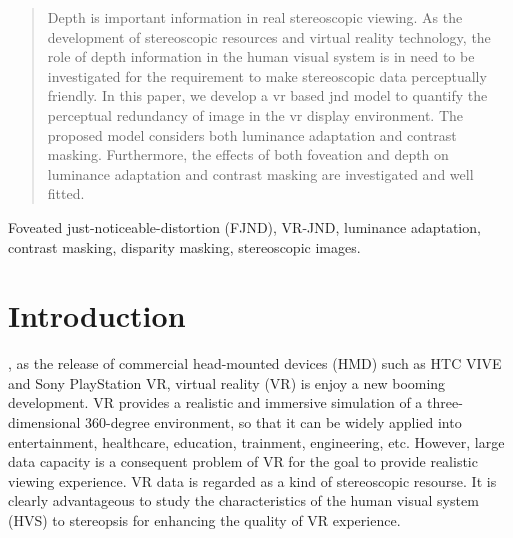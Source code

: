 \documentclass[journal]{IEEEtran}
\begin{document}



\maketitle

\begin{abstract}
Depth is important information in real stereoscopic viewing. As the development of stereoscopic resources and virtual reality technology, the role of depth information in the human visual system is in need to be investigated for the requirement to make stereoscopic data perceptually friendly. In this paper, we develop a vr based jnd model to quantify the perceptual redundancy of image in the vr display environment. The proposed model considers both luminance adaptation and contrast masking. Furthermore, the effects of both foveation and depth on luminance adaptation and contrast masking are investigated and well fitted.
\end{abstract}

\begin{IEEEkeywords}
Foveated just-noticeable-distortion (FJND), VR-JND, luminance adaptation, contrast masking, disparity masking, stereoscopic images.
\end{IEEEkeywords}


\IEEEpeerreviewmaketitle

\section{Introduction}
, as the release of commercial head-mounted devices (HMD) such as HTC VIVE and Sony PlayStation VR, virtual reality (VR) is enjoy a new booming development. VR provides a realistic and immersive simulation of a three-dimensional 360-degree environment, so that it can be widely applied into entertainment, healthcare, education, trainment, engineering, etc. However, large data capacity is a consequent problem of VR for the goal to provide realistic viewing experience. VR data is regarded as a kind of stereoscopic resourse. It is clearly advantageous to study the characteristics of the human visual system (HVS) to stereopsis for enhancing the quality of VR experience.
\end{document}
